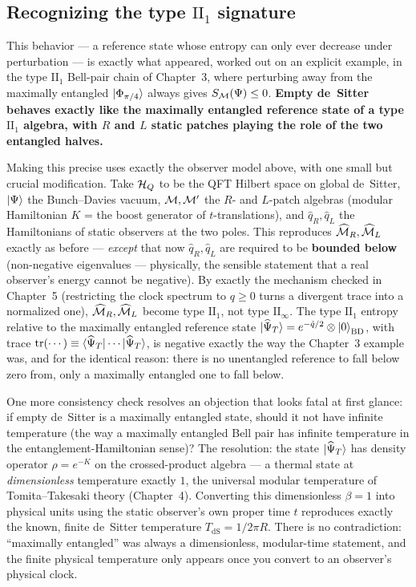 \subsection*{Recognizing the type \texorpdfstring{$\mathrm{II}_1$}{II1} signature}

This behavior — a reference state whose entropy can only ever decrease under perturbation — is exactly what
appeared, worked out on an explicit example, in the type $\mathrm{II}_1$ Bell-pair chain of Chapter~3, where
perturbing away from the maximally entangled $\ket{\Phi_{\pi/4}}$ always gives $S_{\mathcal{M}}(\Psi)\le0$.
\textbf{Empty de~Sitter behaves exactly like the maximally entangled reference state of a type
$\mathrm{II}_1$ algebra, with $R$ and $L$ static patches playing the role of the two entangled halves.}

Making this precise uses exactly the observer model above, with one small but crucial modification. Take
$\mathcal{H}_Q$ to be the QFT Hilbert space on global de~Sitter, $\ket\Psi$ the Bunch--Davies vacuum, $\mathcal{M},\mathcal{M}'$ the $R$-
and $L$-patch algebras (modular Hamiltonian $K$ = the boost generator of $t$-translations), and $\hat q_R,\hat
q_L$ the Hamiltonians of static observers at the two poles. This reproduces $\widehat{\mathcal{M}}_R,\widehat{\mathcal{M}}_L$ exactly
as before — \emph{except} that now $\hat q_R,\hat q_L$ are required to be \textbf{bounded below} (non-negative
eigenvalues — physically, the sensible statement that a real observer's energy cannot be negative). By exactly
the mechanism checked in Chapter~5 (restricting the clock spectrum to $q\ge0$ turns a divergent trace into a
normalized one), $\widehat{\mathcal{M}}_R,\widehat{\mathcal{M}}_L$ become type $\mathrm{II}_1$, not type $\mathrm{II}_\infty$. The
type $\mathrm{II}_1$ entropy relative to the maximally entangled reference state
$\ket{\widehat\Psi_T}=e^{-\hat q/2}\otimes\ket0_{\text{BD}}$, with trace $\operatorname{tr}(\cdots)\equiv\braket{
\widehat\Psi_T|\cdots|\widehat\Psi_T}$, is negative exactly the way the Chapter~3 example was, and for the
identical reason: there is no unentangled reference to fall below zero from, only a maximally entangled one to
fall below.

One more consistency check resolves an objection that looks fatal at first glance: if empty de~Sitter is a
maximally entangled state, should it not have infinite temperature (the way a maximally entangled Bell pair
has infinite temperature in the entanglement-Hamiltonian sense)? The resolution: the state
$\ket{\widehat\Psi_T}$ has density operator $\rho=e^{-K}$ on the crossed-product algebra — a thermal state at
\emph{dimensionless} temperature exactly $1$, the universal modular temperature of Tomita--Takesaki theory
(Chapter~4). Converting this dimensionless $\beta=1$ into physical units using the static observer's own
proper time $t$ reproduces exactly the known, finite de~Sitter temperature $T_{\text{dS}}=1/2\pi R$. There is
no contradiction: ``maximally entangled'' was always a dimensionless, modular-time statement, and the finite
physical temperature only appears once you convert to an observer's physical clock.

